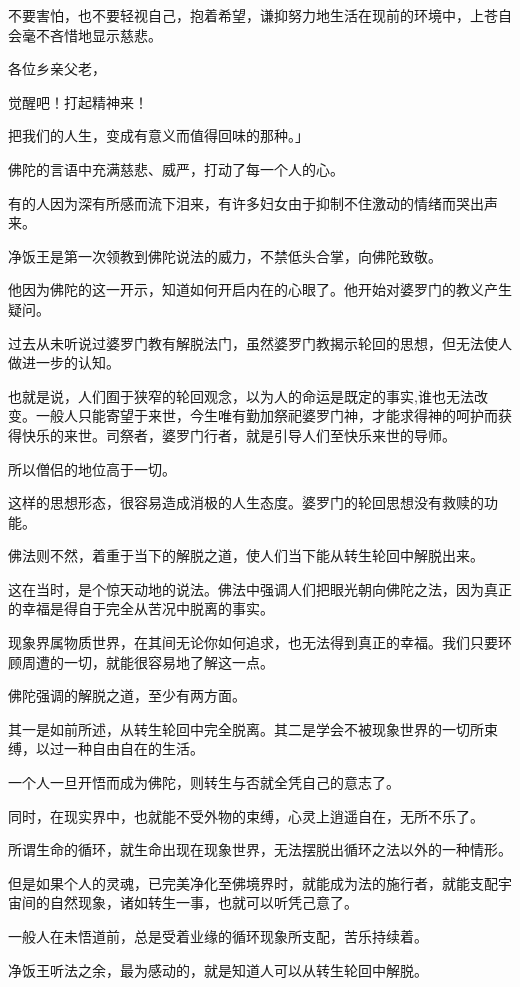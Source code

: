 \documentclass[twoside,openany]{book}
\begin{document}
不要害怕，也不要轻视自己，抱着希望，谦抑努力地生活在现前的环境中，上苍自会毫不吝惜地显示慈悲。

各位乡亲父老，

觉醒吧！打起精神来！

把我们的人生，变成有意义而值得回味的那种。」

佛陀的言语中充满慈悲、威严，打动了每一个人的心。

有的人因为深有所感而流下泪来，有许多妇女由于抑制不住激动的情绪而哭出声来。

净饭王是第一次领教到佛陀说法的威力，不禁低头合掌，向佛陀致敬。

他因为佛陀的这一开示，知道如何开启内在的心眼了。他开始对婆罗门的教义产生疑问。

过去从未听说过婆罗门教有解脱法门，虽然婆罗门教揭示轮回的思想，但无法使人做进一步的认知。

也就是说，人们囿于狭窄的轮回观念，以为人的命运是既定的事实,谁也无法改变。一般人只能寄望于来世，今生唯有勤加祭祀婆罗门神，才能求得神的呵护而获得快乐的来世。司祭者，婆罗门行者，就是引导人们至快乐来世的导师。

所以僧侣的地位高于一切。

这样的思想形态，很容易造成消极的人生态度。婆罗门的轮回思想没有救赎的功能。

佛法则不然，着重于当下的解脱之道，使人们当下能从转生轮回中解脱出来。

这在当时，是个惊天动地的说法。佛法中强调人们把眼光朝向佛陀之法，因为真正的幸福是得自于完全从苦况中脱离的事实。

现象界属物质世界，在其间无论你如何追求，也无法得到真正的幸福。我们只要环顾周遭的一切，就能很容易地了解这一点。

佛陀强调的解脱之道，至少有两方面。

其一是如前所述，从转生轮回中完全脱离。其二是学会不被现象世界的一切所束缚，以过一种自由自在的生活。

一个人一旦开悟而成为佛陀，则转生与否就全凭自己的意志了。

同时，在现实界中，也就能不受外物的束缚，心灵上逍遥自在，无所不乐了。

所谓生命的循环，就生命出现在现象世界，无法摆脱出循环之法以外的一种情形。

但是如果个人的灵魂，已完美净化至佛境界时，就能成为法的施行者，就能支配宇宙间的自然现象，诸如转生一事，也就可以听凭己意了。

一般人在未悟道前，总是受着业缘的循环现象所支配，苦乐持续着。

净饭王听法之余，最为感动的，就是知道人可以从转生轮回中解脱。
\end{document}
